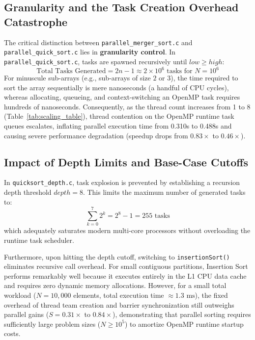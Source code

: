 \documentclass[12pt]{article}
\begin{document}
\subsection{Granularity and the Task Creation Overhead Catastrophe}
The critical distinction between \texttt{parallel\_merger\_sort.c} and \texttt{parallel\_quick_sort.c} lies in \textbf{granularity control}. In \texttt{parallel\_quick\_sort.c}, tasks are spawned recursively until $low \ge high$:
\[
\text{Total Tasks Generated} = 2n - 1 \approx 2 \times 10^6 \text{ tasks for } N = 10^6
\]
For minuscule sub-arrays (e.g., sub-arrays of size $2$ or $3$), the time required to sort the array sequentially is mere nanoseconds (a handful of CPU cycles), whereas allocating, queueing, and context-switching an OpenMP task requires hundreds of nanoseconds. Consequently, as the thread count increases from 1 to 8 (Table~\ref{tab:scaling_table}), thread contention on the OpenMP runtime task queues escalates, inflating parallel execution time from 0.310s to 0.488s and causing severe performance degradation (speedup drops from $0.83\times$ to $0.46\times$).

\subsection{Impact of Depth Limits and Base-Case Cutoffs}
In \texttt{quicksort_depth.c}, task explosion is prevented by establishing a recursion depth threshold $depth = 8$. This limits the maximum number of generated tasks to:
\[
\sum_{k=0}^{7} 2^k = 2^8 - 1 = 255 \text{ tasks}
\]
which adequately saturates modern multi-core processors without overloading the runtime task scheduler. 

Furthermore, upon hitting the depth cutoff, switching to \texttt{insertionSort()} eliminates recursive call overhead. For small contiguous partitions, Insertion Sort performs remarkably well because it executes entirely in the L1 CPU data cache and requires zero dynamic memory allocations. However, for a small total workload ($N=10,000$ elements, total execution time $\approx 1.3\text{ ms}$), the fixed overhead of thread team creation and barrier synchronization still outweighs parallel gains ($S = 0.31\times$ to $0.84\times$), demonstrating that parallel sorting requires sufficiently large problem sizes ($N \ge 10^5$) to amortize OpenMP runtime startup costs.
\end{document}
